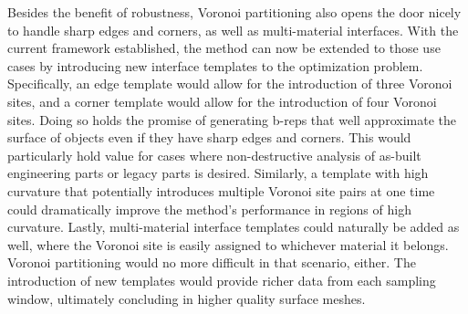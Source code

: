 Besides the benefit of robustness, Voronoi partitioning also opens the door nicely to handle sharp edges and corners, as well as multi-material interfaces. With the current framework established, the method can now be extended to those use cases by introducing new interface templates to the optimization problem. Specifically, an edge template would allow for the introduction of three Voronoi sites, and a corner template would allow for the introduction of four Voronoi sites. Doing so holds the promise of generating b-reps that well approximate the surface of objects even if they have sharp edges and corners. This would particularly hold value for cases where non-destructive analysis of as-built engineering parts or legacy parts is desired. Similarly, a template with high curvature that potentially introduces multiple Voronoi site pairs at one time could dramatically improve the method's performance in regions of high curvature. Lastly, multi-material interface templates could naturally be added as well, where the Voronoi site is easily assigned to whichever material it belongs. Voronoi partitioning would no more difficult in that scenario, either. The introduction of new templates would provide richer data from each sampling window, ultimately concluding in higher quality surface meshes.